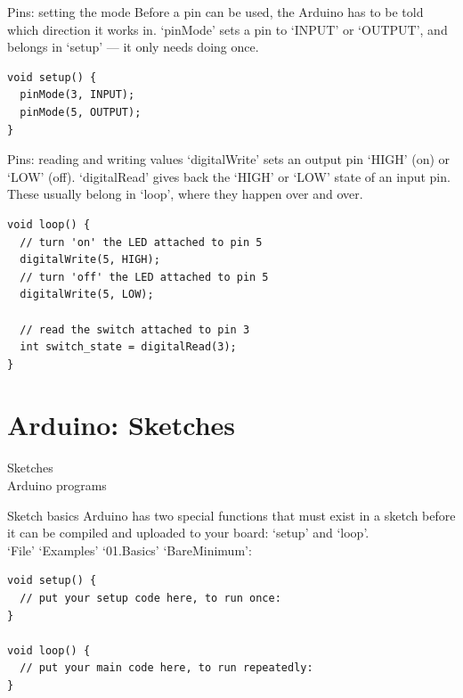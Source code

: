 \documentclass[aspectratio=169]{beamer}
\begin{document}
\begin{frame}[fragile]{Pins: setting the mode}
    \normalsize
    Before a pin can be used, the Arduino has to be told which direction it works in. `pinMode' sets a pin to `INPUT' or `OUTPUT', and belongs in `setup' --- it only needs doing once.
    \vspace{.5em}
    \begin{verbatim}
void setup() {
  pinMode(3, INPUT);
  pinMode(5, OUTPUT);
}
\end{verbatim}
\end{frame}

\begin{frame}[fragile]{Pins: reading and writing values}
    \normalsize
    `digitalWrite' sets an output pin `HIGH' (on) or `LOW' (off). `digitalRead' gives back the `HIGH' or `LOW' state of an input pin. These usually belong in `loop', where they happen over and over.
    \vspace{.5em}
    \begin{verbatim}
void loop() {
  // turn 'on' the LED attached to pin 5
  digitalWrite(5, HIGH);
  // turn 'off' the LED attached to pin 5
  digitalWrite(5, LOW);

  // read the switch attached to pin 3
  int switch_state = digitalRead(3);
}
\end{verbatim}
\end{frame}



\section{Arduino: Sketches}

\begin{frame}[standout]
    \LARGE Sketches\\
    \normalsize Arduino programs
\end{frame}


\begin{frame}[fragile]{Sketch basics}
    \large
    Arduino has two special functions that must exist in a sketch before it can be compiled and uploaded to your board: `setup' and `loop'.\\

    \vspace{.25em}
    `File' \textrightarrow `Examples' \textrightarrow `01.Basics' \textrightarrow `BareMinimum':\\
    \vspace{-.5em}
    \begin{verbatim}
void setup() {
  // put your setup code here, to run once:
}

void loop() {
  // put your main code here, to run repeatedly:
}
\end{verbatim}
\end{frame}
\end{document}
